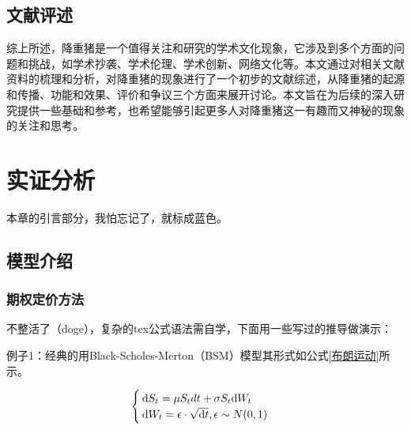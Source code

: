 {\vspace{-0.6em}
\subsection{文献评述}

综上所述，降重猪是一个值得关注和研究的学术文化现象，它涉及到多个方面的问题和挑战，如学术抄袭、学术伦理、学术创新、网络文化等。本文通过对相关文献资料的梳理和分析，对降重猪的现象进行了一个初步的文献综述，从降重猪的起源和传播、功能和效果、评价和争议三个方面来展开讨论。本文旨在为后续的深入研究提供一些基础和参考，也希望能够引起更多人对降重猪这一有趣而又神秘的现象的关注和思考。



\newpage
\section{实证分析}

\textcolor[RGB]{0,0,255}{本章的引言部分，我怕忘记了，就标成蓝色。}

\vspace{-0.6em}
\subsection{模型介绍}

\subsubsection{期权定价方法}

不整活了（doge），复杂的tex公式语法需自学，下面用一些写过的推导做演示：

例子1：经典的用Black-Scholes-Merton（BSM）模型其形式如公式\eqref{布朗运动}所示。%

\begin{equation}
	\label{布朗运动} %
	\setlength\abovedisplayshortskip{-0.3cm} %
	\setlength\belowdisplayshortskip{0.5cm} %
		\begin{cases} %
		\text{d}S_t=\mu S_t dt+\sigma S_t \text{d}W_t\\ %
		\text{d}W_t=\epsilon\cdot \sqrt{ \text{d}t},\epsilon \sim N(0,1)
		\end{cases}
\end{equation}

}
